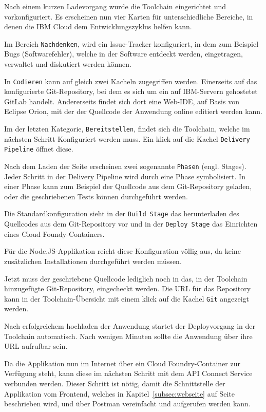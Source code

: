 Nach einem kurzen Ladevorgang wurde die Toolchain eingerichtet und vorkonfiguriert. Es erscheinen nun vier Karten für
unterschiedliche Bereiche, in denen die IBM Cloud dem Entwicklungszyklus helfen kann.

Im Bereich \texttt{Nachdenken}, wird ein Issue-Tracker konfiguriert, in dem zum Beispiel Bugs (Softwarefehler), welche
in der Software entdeckt werden, eingetragen, verwaltet und diskutiert werden können.

In \texttt{Codieren} kann auf gleich zwei Kacheln zugegriffen werden. Einerseits auf das konfigurierte Git-Repository,
bei dem es sich um ein auf IBM-Servern gehostetet GitLab handelt. Andererseits findet sich dort eine Web-IDE, auf Basis
von Eclipse Orion, mit der der Quellcode der Anwendung online editiert werden kann.

Im der letzten Kategorie, \texttt{Bereitstellen}, findet sich die Toolchain, welche im nächsten Schritt Konfiguriert werden
muss. Ein klick auf die Kachel \texttt{Delivery Pipeline} öffnet diese.

Nach dem Laden der Seite erscheinen zwei sogenannte \texttt{Phasen} (engl. Stages). Jeder Schritt in der Delivery Pipeline
wird durch eine Phase symbolisiert. In einer Phase kann zum Beispiel der Quellcode aus dem Git-Repository geladen, oder
die geschriebenen Tests können durchgeführt werden.

Die Standardkonfiguration sieht in der \texttt{Build Stage} das herunterladen des Quellcodes aus dem Git-Repository vor
und in der \texttt{Deploy Stage} das Einrichten eines Cloud Foundy-Containers.

Für die Node.JS-Applikation reicht diese Konfiguration völlig aus, da keine zusätzlichen Installationen durchgeführt
werden müssen.

Jetzt muss der geschriebene Quellcode lediglich noch in das, in der Toolchain hinzugefügte Git-Repository, eingecheckt
werden. Die URL für das Repository kann in der Toolchain-Übersicht mit einem klick auf die Kachel \texttt{Git} angezeigt
werden.

Nach erfolgreichem hochladen der Anwendung startet der Deployvorgang in der Toolchain automatisch. Nach wenigen Minuten
sollte die Anwendung über ihre URL aufrufbar sein.

Da die Applikation nun im Internet über ein Cloud Foundry-Container zur Verfügung steht, kann diese im nächsten Schritt
mit dem API Connect Service verbunden werden. Dieser Schritt ist nötig, damit die Schnittstelle der Applikation vom
Frontend, welches in Kapitel~\ref{subsec:webseite} auf Seite~\pageref{subsec:webseite} beschrieben wird, und über Postman
vereinfacht und aufgerufen werden kann.

